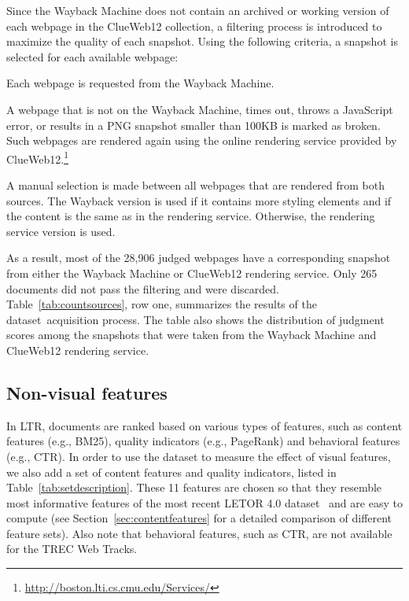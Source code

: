 \label{sec:datasetsum}
Since the Wayback Machine does not contain an archived or working version of each webpage in the ClueWeb12 collection, a filtering process is introduced to maximize the quality of each snapshot. Using the following criteria, a snapshot is selected for each available webpage:
\begin{inparaenum}[(1)]%
\item Each webpage is requested from the Wayback Machine. 
\item A webpage that is not on the Wayback Machine, times out, throws a JavaScript error, or results in a PNG snapshot smaller than 100KB is marked as broken. Such webpages are rendered again using the online rendering service provided by ClueWeb12.\footnote{\url{http://boston.lti.cs.cmu.edu/Services/}}
\item A manual selection is made between all webpages that are rendered from both sources. The Wayback version is used if it contains more styling elements and if the content is the same as in the rendering service. Otherwise, the rendering service version is used. 
\end{inparaenum}

As a result, most of the 28,906 judged webpages have a corresponding snapshot from either the Wayback Machine or ClueWeb12 rendering service.
Only 265 documents did not pass the filtering and were discarded.
Table~\ref{tab:countsources}, row one, summarizes the results of the \datasetname{} dataset~acquisition process. The table also shows the distribution of judgment scores among the snapshots that were taken from the Wayback Machine and ClueWeb12 rendering service.


\subsection{Non-visual features} 
\label{sec:contentfeature}
In LTR, documents are ranked based on various types of features, such as content features (e.g., BM25), quality indicators (e.g., PageRank) and behavioral features (e.g., CTR).
In order to use the \datasetname{} dataset to measure the effect of visual features, we also add a set of content features and quality indicators,
listed in Table~\ref{tab:setdescription}.
These 11 features are chosen so that they resemble most informative features of the most recent LETOR 4.0 dataset~\cite{Qin2013:Introducing} and are easy to compute
(see Section~\ref{sec:contentfeatures} for a detailed comparison of different feature sets).
Also note that behavioral features, such as CTR, are not available for the TREC Web Tracks.

